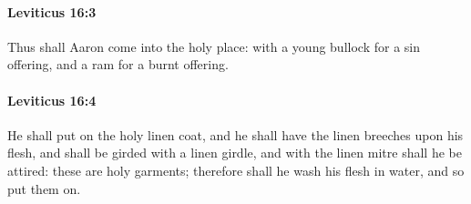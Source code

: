 		\paragraph{Leviticus 16:3} %
			\label{LEVITICUS-16-3}

			Thus shall Aaron come into the holy place: with a young bullock for a sin offering, and a ram for a burnt offering.


		\paragraph{Leviticus 16:4} %
			\label{LEVITICUS-16-4}

			He shall put on the holy linen coat, and he shall have the linen breeches upon his flesh, and shall be girded with a linen girdle, and with the linen mitre shall he be attired: these are holy garments; therefore shall he wash his flesh in water, and so put them on.

